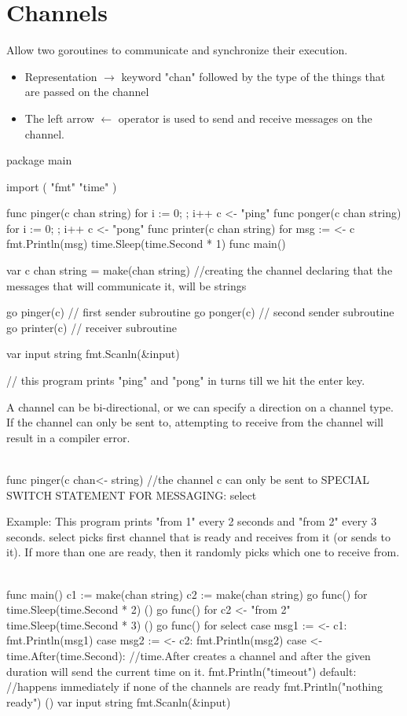 \documentclass[twoside,a4paper,english]{report}
\begin{document}
\section{Channels}
Allow two goroutines to communicate and synchronize their execution.
\begin{itemize}
\item Representation $\rightarrow$ keyword "chan" followed by the type of the things that are passed on the channel
\item The left arrow $\leftarrow$ operator is used to send and receive messages on the channel.
\end{itemize}
\begin{go}
package main

import (
  "fmt"
  "time" 
)

func pinger(c chan string) {
  for i := 0; ; i++ {
    c <- "ping" 
  }
}
func ponger(c chan string) {
  for i := 0; ; i++ {
    c <- "pong" 
  }
}
func printer(c chan string) {
  for {
    msg := <- c
    fmt.Println(msg)
    time.Sleep(time.Second * 1)
  }
}
func main() {
  var c chan string = make(chan string)  //creating the channel declaring that the messages that will communicate it, will be strings

  go pinger(c)  // first sender subroutine
  go ponger(c)  // second sender subroutine
  go printer(c) // receiver subroutine

  var input string
  fmt.Scanln(&input)
}

  // this program prints "ping" and "pong" in turns till we hit the enter key.
\end{go}
A channel can be bi-directional, or we can specify a direction on a channel type. If the channel can only be sent to, attempting to receive from the channel will result in a compiler error.\\\\
\begin{go}
func pinger(c chan<- string) //the channel c can only be sent to SPECIAL SWITCH STATEMENT FOR MESSAGING: select
\end{go}
Example: This program prints "from 1" every 2 seconds and "from 2" every 3 seconds. select picks first channel that is ready and receives from it (or sends to it). If more than one are ready, then it randomly picks which one to receive from.\\\\
\begin{go}
func main() {
  c1 := make(chan string)
  c2 := make(chan string)
  go func() {
    for {
      time.Sleep(time.Second * 2)
    }
  }()
  go func() {
    for {
      c2 <- "from 2"
      time.Sleep(time.Second * 3)
    }
  }()
  go func() {
    for {
      select {
        case msg1 := <- c1:
          fmt.Println(msg1)
        case msg2 := <- c2:
          fmt.Println(msg2)
        case <- time.After(time.Second): //time.After creates a channel and after the given duration will send the current time on it.
          fmt.Println("timeout") 
        default: //happens immediately if none of the channels are ready
          fmt.Println("nothing ready")    
      } 
    }
  }()
  var input string
  fmt.Scanln(&input)
}   
\end{go}
\end{document}
